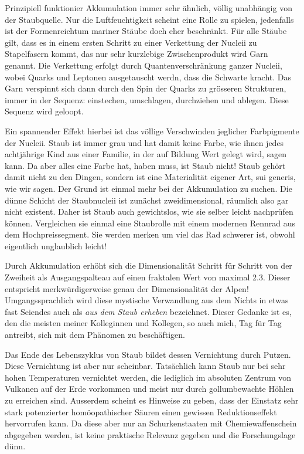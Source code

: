 Prinzipiell funktionier Akkumulation immer sehr ähnlich, völlig unabhängig von der Staubquelle. Nur die Luftfeuchtigkeit scheint eine Rolle zu spielen, jedenfalls ist der Formenreichtum mariner Stäube doch eher beschränkt. Für alle Stäube gilt, dass es in einem ersten Schritt zu einer Verkettung der Nucleii zu Stapelfasern kommt, das nur sehr kurzlebige Zwischenprodukt wird Garn genannt. Die Verkettung erfolgt durch Quantenverschränkung ganzer Nucleii, wobei Quarks und Leptonen ausgetauscht werdn, dass die Schwarte kracht. Das Garn verspinnt sich dann durch den Spin der Quarks zu grösseren Strukturen, immer in der Sequenz: einstechen, umschlagen, durchziehen und ablegen. Diese Sequenz wird geloopt.

Ein spannender Effekt hierbei ist das völlige Verschwinden jeglicher Farbpigmente der Nucleii. Staub ist immer grau und hat damit keine Farbe, wie ihnen jedes achtjährige Kind aus einer Familie, in der auf Bildung Wert gelegt wird, sagen kann. Da aber alles eine Farbe hat, haben muss, ist Staub nicht! Staub gehört damit nicht zu den Dingen, sondern ist eine Materialität eigener Art, sui generis, wie wir sagen. Der Grund ist einmal mehr bei der Akkumulation zu suchen. Die dünne Schicht der Staubnucleii ist zunächst zweidimensional, räumlich also gar nicht existent. Daher ist Staub auch gewichtslos, wie sie selber leicht nachprüfen können. Vergleichen sie einmal eine Staubrolle mit einem modernen Rennrad aus dem Hochpreissegment. Sie werden merken um viel das Rad schwerer ist, obwohl eigentlich unglaublich leicht! 

Durch Akkumulation erhöht sich die Dimensionalität Schritt für Schritt von der Zweiheit als Ausgangspalteau auf einen fraktalen Wert von maximal 2.3. Dieser entspricht merkwürdigerweise genau der Dimensionalität der Alpen! Umgangssprachlich wird diese mystische Verwandlung aus dem Nichts in etwas fast Seiendes auch als \textit{aus dem Staub erheben} bezeichnet. Dieser Gedanke ist es, den die meisten meiner Kolleginnen und Kollegen, so auch mich, Tag für Tag antreibt, sich mit dem Phänomen zu beschäftigen.

Das Ende des Lebenszyklus von Staub bildet dessen Vernichtung durch Putzen. Diese Vernichtung ist aber nur scheinbar. Tatsächlich kann Staub nur bei sehr hohen Temperaturen vernichtet werden, die lediglich im absoluten Zentrum von Vulkanen auf der Erde vorkommen und meist nur durch gollumbewachte Höhlen zu erreichen sind. Ausserdem scheint es Hinweise zu geben, dass der Einstatz sehr stark potenzierter homöopathischer Säuren einen gewissen Reduktionseffekt hervorrufen kann. Da diese aber nur an Schurkenstaaten mit Chemiewaffenschein abgegeben werden, ist keine praktische Relevanz gegeben und die Forschungslage dünn.

